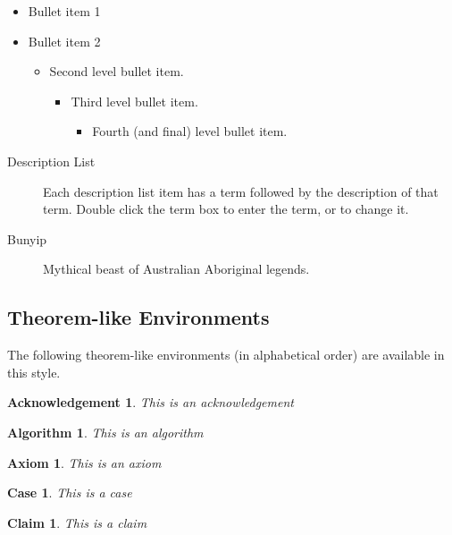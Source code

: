 \documentclass{article}%
\newtheorem{acknowledgement}[theorem]{Acknowledgement}
\newtheorem{algorithm}[theorem]{Algorithm}
\newtheorem{axiom}[theorem]{Axiom}
\newtheorem{case}[theorem]{Case}
\newtheorem{claim}[theorem]{Claim}
\begin{document}
\begin{itemize}
\item Bullet item 1

\item Bullet item 2

\begin{itemize}
\item Second level bullet item.

\begin{itemize}
\item Third level bullet item.

\begin{itemize}
\item Fourth (and final) level bullet item.
\end{itemize}
\end{itemize}
\end{itemize}
\end{itemize}

\begin{description}
\item[Description List] Each description list item has a term followed by the
description of that term. Double click the term box to enter the term, or to
change it.

\item[Bunyip] Mythical beast of Australian Aboriginal legends.
\end{description}

\subsection{Theorem-like Environments}

The following theorem-like environments (in alphabetical order) are available
in this style.

\begin{acknowledgement}
This is an acknowledgement
\end{acknowledgement}

\begin{algorithm}
This is an algorithm
\end{algorithm}

\begin{axiom}
This is an axiom
\end{axiom}

\begin{case}
This is a case
\end{case}

\begin{claim}
This is a claim
\end{claim}
\end{document}
